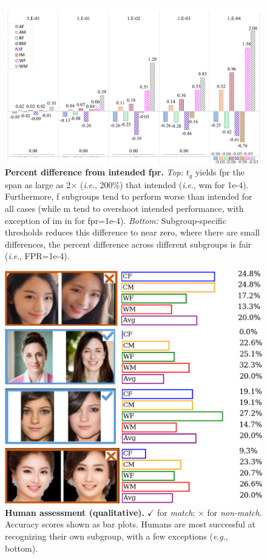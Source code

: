 \documentclass[10pt,twocolumn,letterpaper]{article}
\newcommand{\ie}{\textit{i}.\textit{e}., }
\newcommand{\eg}{\textit{e}.\textit{g}., }
\begin{document}
\begin{figure}[t!]
       \centering
    \includegraphics[width=.95\linewidth]{figures/adaptive_fpr_percent_diff_complete.pdf}
    \caption{\small{\textbf{Percent difference from intended \gls{fpr}.} \emph{Top:} $t_g$ yields \gls{fpr} the span as large as 2$\times$ (\ie 200\%) that intended (\ie \gls{wm} for 1e-4). Furthermore, \gls{f} subgroups tend to perform worse than intended for all cases (while \gls{m} tend to overshoot intended performance, with exception of \gls{im} in for \gls{fpr}=1e-4). \emph{Bottom:} Subgroup-specific thresholds reduces this difference to near zero, where there are small differences, the percent difference across different subgroups is fair (\ie FPR=1e-4).}}\label{fig:percent:difference}
\end{figure}




\begin{figure}[t!] 
	\centering    
	\includegraphics[width=.55\linewidth] {figures/human_eval.pdf}
		\caption{\small{\textbf{Human assessment (qualitative).} $\checkmark$ for \emph{match}; $\times$ for \emph{non-match}. Accuracy scores shown as bar plots. Humans are most successful at recognizing their own subgroup, with a few exceptions (\eg bottom).}}
		\label{fig:human-eval} 
\end{figure} 
\end{document}
